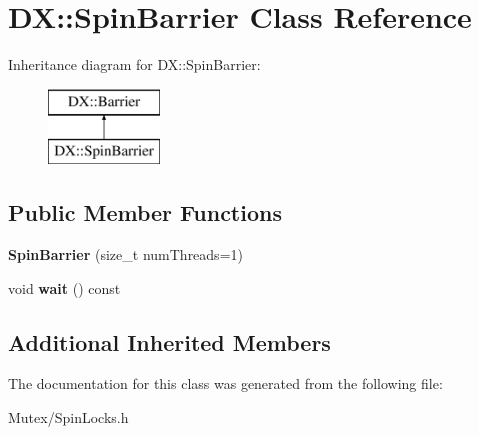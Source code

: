 \hypertarget{class_d_x_1_1_spin_barrier}{\section{D\-X\-:\-:Spin\-Barrier Class Reference}
\label{class_d_x_1_1_spin_barrier}
}
Inheritance diagram for D\-X\-:\-:Spin\-Barrier\-:\begin{figure}[H]
\begin{center}
\leavevmode
\includegraphics[height=2.000000cm]{class_d_x_1_1_spin_barrier}
\end{center}
\end{figure}
\subsection*{Public Member Functions}
\begin{DoxyCompactItemize}
\item 
\hypertarget{class_d_x_1_1_spin_barrier_a655779e1845cbefa59801553b2eafa2d}{{\bfseries Spin\-Barrier} (size\-\_\-t num\-Threads=1)}\label{class_d_x_1_1_spin_barrier_a655779e1845cbefa59801553b2eafa2d}

\item 
\hypertarget{class_d_x_1_1_spin_barrier_acc73c0fb586ae1694b65d2eb5c50c301}{void {\bfseries wait} () const }\label{class_d_x_1_1_spin_barrier_acc73c0fb586ae1694b65d2eb5c50c301}

\end{DoxyCompactItemize}
\subsection*{Additional Inherited Members}


The documentation for this class was generated from the following file\-:\begin{DoxyCompactItemize}
\item 
Mutex/Spin\-Locks.\-h\end{DoxyCompactItemize}
